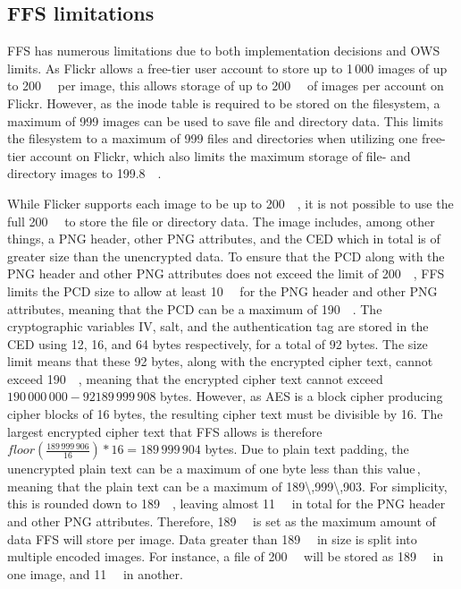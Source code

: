 \subsection{FFS limitations}
\label{subsec:ffs_limits}
\gls{FFS} has numerous limitations due to both implementation decisions and \gls{OWS} limits. As Flickr allows a \mbox{free-tier} user account to store up to 1\,000 images of up to \SI{200}{\mega\byte} per image, this allows storage of up to \SI{200}{\giga\byte} of images per account on Flickr. However, as the inode table is required to be stored on the filesystem, a maximum of 999 images can be used to save file and directory data. This limits the filesystem to a maximum of 999 files and directories when utilizing one \mbox{free-tier} account on Flickr, which also limits the maximum storage of file- and directory images to \SI{199.8}{\giga\byte}.

While Flicker supports each image to be up to \SI{200}{\mega\byte}, it is not possible to use the full \SI{200}{\mega\byte} to store the file or directory data. The image includes, among other things, a PNG header, other PNG attributes, and the \gls{CED} which in total is of greater size than the unencrypted data. To ensure that the \gls{PCD} along with the PNG header and other PNG attributes does not exceed the limit of \SI{200}{\mega\byte}, \gls{FFS} limits the \gls{PCD} size to allow at least \SI{10}{\mega\byte} for the PNG header and other PNG attributes, meaning that the \gls{PCD} can be a maximum of \SI{190}{\mega\byte}. The cryptographic variables \gls{IV}, salt, and the authentication tag are stored in the \gls{CED} using 12, 16, and 64 bytes respectively, for a total of 92 bytes. The size limit means that these 92 bytes, along with the encrypted cipher text, cannot exceed \SI{190}{\mega\byte}, meaning that the encrypted cipher text cannot exceed $190\,000\,000 - 92 189\,999\,908$ bytes. However, as \gls{AES} is a block cipher producing cipher blocks of 16 bytes, the resulting cipher text must be divisible by 16. The largest encrypted cipher text that \gls{FFS} allows is therefore $floor(\frac{189\,999\,906}{16})*16 = 189\,999\,904$ bytes. Due to plain text padding, the unencrypted plain text can be a maximum of one byte less than this value\,\cite{z.z.coderAnswerSizeData2010}, meaning that the plain text can be a maximum of \SI{189\,999\,903}{\byte}. For simplicity, this is rounded down to \SI{189}{\mega\byte}, leaving almost \SI{11}{\mega\byte} in total for the PNG header and other PNG attributes. Therefore, \SI{189}{\mega\byte} is set as the maximum amount of data \gls{FFS} will store per image. Data greater than \SI{189}{\mega\byte} in size is split into multiple encoded images. For instance, a file of \SI{200}{\mega\byte} will be stored as \SI{189}{\mega\byte} in one image, and \SI{11}{\mega\byte} in another. 

